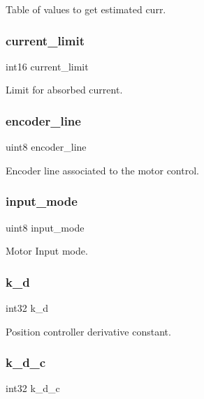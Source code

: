 Table of values to get estimated curr. \mbox{\label{structst__motor_a96f2aec80e40c1bbe82186a4261ab7ac}} 
\subsubsection{current\+\_\+limit}
{\footnotesize\ttfamily int16 current\+\_\+limit}

Limit for absorbed current. \mbox{\label{structst__motor_af1ace45d6367665a8e871afe5617feb1}} 
\subsubsection{encoder\+\_\+line}
{\footnotesize\ttfamily uint8 encoder\+\_\+line}

Encoder line associated to the motor control. \mbox{\label{structst__motor_ae5cc8b2ae06016f1fcf5b2f964618a12}} 
\subsubsection{input\+\_\+mode}
{\footnotesize\ttfamily uint8 input\+\_\+mode}

Motor Input mode. \mbox{\label{structst__motor_ab9d15eaa4612dd1c5597e5634cd1d66c}} 
\subsubsection{k\+\_\+d}
{\footnotesize\ttfamily int32 k\+\_\+d}

Position controller derivative constant. \mbox{\label{structst__motor_af32cf4ebfb30ad068ea530d03ff9a96f}} 
\subsubsection{k\+\_\+d\+\_\+c}
{\footnotesize\ttfamily int32 k\+\_\+d\+\_\+c}

